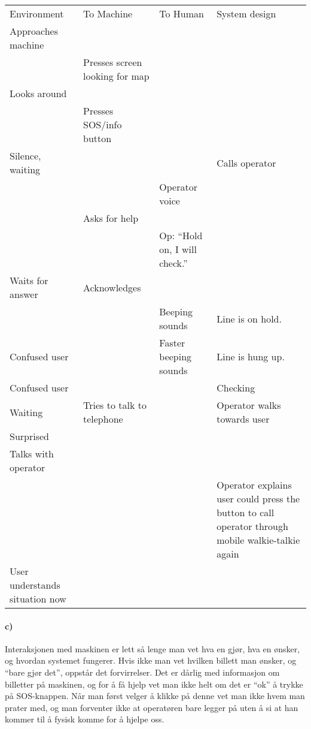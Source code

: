 \documentclass{../../myassignment}
\begin{document}
	\begin{tabular}{ | >{\centering}p{10em} || >{\raggedleft}p{10em} | >{\raggedright}p{10em} || >{\centering\arraybackslash}p{10em} | }
	\hline
	\multicolumn{2}{|c|}{Human} & \multicolumn{2}{c|}{Machine} \\\hline
	Environment & {To Machine} & To Human & System design\\\hline\hline
	Approaches machine & & & \\\hline
	 & Presses screen looking for map & & \\\hline
	Looks around &  & & \\\hline
	 & Presses SOS/info button &  & \\\hline
	Silence, waiting &  &  & Calls operator \\\hline
	 &  & Operator voice & \\\hline
	 & Asks for help &  & \\\hline
	 &  & Op: ``Hold on, I will check.'' & \\\hline
	Waits for answer & Acknowledges &  & \\\hline
	 &  & Beeping sounds & Line is on hold. \\\hline
	Confused user &  & Faster beeping sounds & Line is hung up. \\\hline
	Confused user &  &  & Checking \\\hline
	Waiting & Tries to talk to telephone &  & Operator walks towards user \\\hline
	Surprised &  &  & \\\hline
	Talks with operator &  &  & \\\hline
	 &  &  & Operator explains user could press the button to call operator through mobile walkie-talkie again \\\hline
	User understands situation now &  &  &  \\\hline

	\end{tabular}

	\paragraph*{c)}  %

	Interaksjonen med maskinen er lett s{\aa} lenge man vet hva en gj{\o}r, hva en {\o}nsker, og hvordan systemet fungerer. Hvis ikke man vet hvilken billett man {\o}nsker, og ``bare gj{\o}r det'', oppst{\aa}r det forvirrelser. Det er d{\aa}rlig med informasjon om billetter p{\aa} maskinen, og for {\aa} f{\aa} hjelp vet man ikke helt om det er ``ok'' {\aa} trykke p{\aa} SOS-knappen. N{\aa}r man f{\o}rst velger {\aa} klikke p{\aa} denne vet man ikke hvem man prater med, og man forventer ikke at operat{\o}ren bare legger p{\aa} uten {\aa} si at han kommer til {\aa} fysisk komme for {\aa} hjelpe oss.
\end{document}
